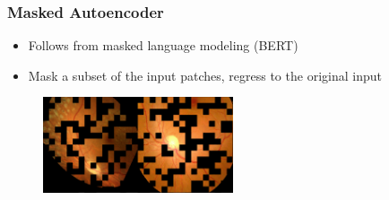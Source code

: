 \documentclass{beamer}
\begin{document}
\begin{frame}
   \frametitle{Masked Autoencoder}
   \begin{itemize}
        \item Follows from masked language modeling (BERT) \cite{devlin2019bert}
        \item Mask a subset of the input patches, regress to the original input
   \end{itemize}
   \begin{figure}
       \centering
       \includegraphics[width=0.5\textwidth]{mae_example.png}
   \end{figure}
\end{frame}
\end{document}
